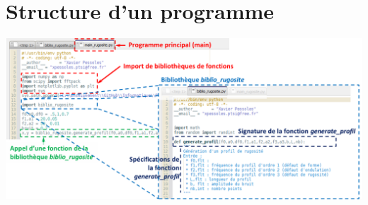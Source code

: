 \documentclass[10pt]{article}
\begin{document}
\section{Structure d'un programme}
\begin{center}
\includegraphics[width=\textwidth]{images/fonctions}
\end{center}
\end{document}
